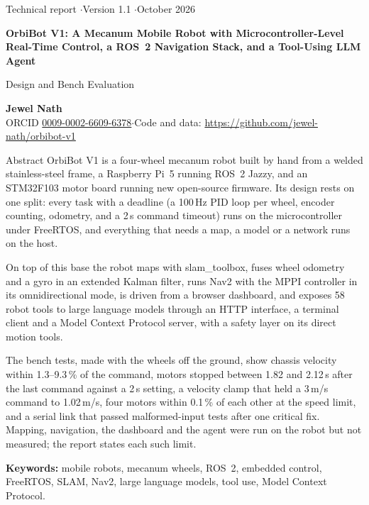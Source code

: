\documentclass[11pt]{article}
\begin{document}
\thispagestyle{empty}
\begin{tcolorbox}[colback=accent, colframe=accent, arc=3pt, left=14pt, right=14pt, top=14pt, bottom=12pt]
  \color{white}\sffamily\raggedright
  {\small Technical report \quad$\cdot$\quad Version 1.1 \quad$\cdot$\quad October 2026}\par\vspace{8pt}
  {\LARGE\bfseries OrbiBot V1: A Mecanum Mobile Robot with Microcontroller-Level Real-Time Control, a ROS~2 Navigation Stack, and a Tool-Using LLM Agent}\par\vspace{6pt}
  {\large Design and Bench Evaluation}
\end{tcolorbox}

\vspace{4pt}
{\sffamily
\textbf{Jewel Nath}\\
{\small\color{muted}ORCID \href{https://orcid.org/0009-0002-6609-6378}{0009-0002-6609-6378}\quad$\cdot$\quad Code and data: \url{https://github.com/jewel-nath/orbibot-v1}}\par}

\vspace{6pt}
\begin{summarybox}{Abstract}
OrbiBot V1 is a four-wheel mecanum robot built by hand from a welded stainless-steel frame, a Raspberry Pi~5 running ROS~2 Jazzy, and an STM32F103 motor board running new open-source firmware. Its design rests on one split: every task with a deadline (a 100\,Hz PID loop per wheel, encoder counting, odometry, and a 2\,s command timeout) runs on the microcontroller under FreeRTOS, and everything that needs a map, a model or a network runs on the host.

On top of this base the robot maps with slam\_toolbox, fuses wheel odometry and a gyro in an extended Kalman filter, runs Nav2 with the MPPI controller in its omnidirectional mode, is driven from a browser dashboard, and exposes 58 robot tools to large language models through an HTTP interface, a terminal client and a Model Context Protocol server, with a safety layer on its direct motion tools.

The bench tests, made with the wheels off the ground, show chassis velocity within 1.3--9.3\,\% of the command, motors stopped between 1.82 and 2.12\,s after the last command against a 2\,s setting, a velocity clamp that held a 3\,m/s command to 1.02\,m/s, four motors within 0.1\,\% of each other at the speed limit, and a serial link that passed malformed-input tests after one critical fix. Mapping, navigation, the dashboard and the agent were run on the robot but not measured; the report states each such limit.

\smallskip
{\sffamily\small\textbf{Keywords:} mobile robots, mecanum wheels, ROS~2, embedded control, FreeRTOS, SLAM, Nav2, large language models, tool use, Model Context Protocol.}
\end{summarybox}
\end{document}
